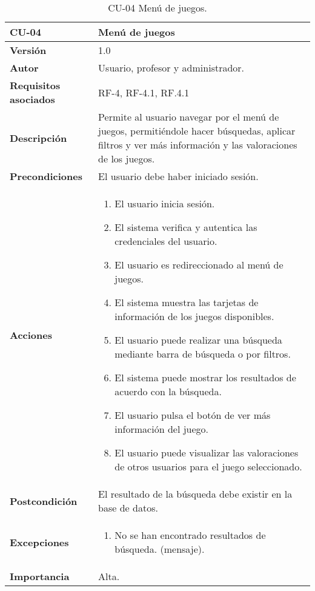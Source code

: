 \begin{table}[p]
	\centering
	\begin{tabularx}{\linewidth}{ p{} p{} }
		\toprule
		\textbf{CU-04}    & \textbf{Menú de juegos}\\
		\toprule
		\textbf{Versión}              & 1.0    \\
		\textbf{Autor}                & Usuario, profesor y administrador. \\
		\textbf{Requisitos asociados} & RF-4, RF-4.1, RF.4.1 \\
		\textbf{Descripción}          & Permite al usuario navegar por el menú de juegos, permitiéndole hacer búsquedas, aplicar filtros y ver más información y las valoraciones de los juegos.\\
		\textbf{Precondiciones}         & El usuario debe haber iniciado sesión. \\
		\textbf{Acciones}             &
		\begin{enumerate}
			\def\labelenumi{\arabic{enumi}.}
			\tightlist
			\item El usuario inicia sesión.
            \item El sistema verifica y autentica las credenciales del usuario.
            \item El usuario es redireccionado al menú de juegos.
            \item El sistema muestra las tarjetas de información de los juegos disponibles.
            \item El usuario puede realizar una búsqueda mediante barra de búsqueda o por filtros.
            \item El sistema puede mostrar los resultados de acuerdo con la búsqueda.
            \item El usuario pulsa el botón de ver más información del juego.
            \item El usuario puede visualizar las valoraciones de otros usuarios para el juego seleccionado.
		\end{enumerate}\\
         \textbf{Postcondición}             & El resultado de la búsqueda debe existir en la base de datos. \\
		\textbf{Excepciones}             &
		\begin{enumerate}
			\def\labelenumi{\arabic{enumi}.}
			\tightlist
			\item No se han encontrado resultados de búsqueda. (mensaje).
		\end{enumerate}\\
		\textbf{Importancia}          & Alta. \\
		\bottomrule
	\end{tabularx}
	\caption{CU-04 Menú de juegos.}
\end{table}

